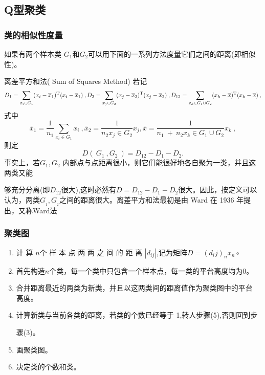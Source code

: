 \documentclass[12pt]{ctexart}
\numberwithin{equation}{section} %
\begin{document}
\subsection{Q型聚类}
\subsubsection{类的相似性度量}

如果有两个样本类 $G_1$和$G_2$可以用下面的一系列方法度量它们之间的距离(即相似性)。

离差平方和法( Sum of Squares Method)
 若记$$D_{1}=\sum_{x_{i}\in G_{1}}(x_{i}-\overline{x}_{1})^{\mathrm{T}}(x_{i}-\overline{x}_{1})\:,D_{2}=\sum_{x_{j}\in G_{2}}(x_{j}-\overline{x}_{2})^{\mathrm{T}}(x_{j}-\overline{x}_{2})\:,\\D_{12}=\sum_{x_{k}\in G_{1}\cup G_{2}}(x_{k}-\overline{x})^{\mathrm{T}}(x_{k}-\overline{x})\:,$$
式中
$$\overline{x}_{1}=\frac{1}{n_{1}}\sum_{x_{i}\in G_{1}}x_{i}\:,\overline{x}_{2}=\frac{1}{n_{2}x_{j}\in G_{2}}x_{j},\overline{x}=\frac{1}{n_{1}\:+\:n_{2}x_{k}\in G_{1}\cup G_{2}}x_{k}\:,$$
则定
$$D(\:G_{1}\:,G_{2}\:)=D_{12}-D_{1}-D_{2}.$$
事实上，若$G_1,G_2$ 内部点与点距离很小，则它们能很好地各自聚为一类，并且这两类又能

够充分分离(即$D_{12}$很大),这时必然有$D=D_{12}-D_{1}-D_{2}$很大。因此，按定义可以认为，两类$G_{_1},G_{_2}$之间的距离很大。离差平方和法最初是由 Ward 在 1936 年提出，又称Ward法
  
\subsubsection{聚类图}
\begin{enumerate}


  \item 计 算  $n$个 样 本 点 两 两 之 间 的 距 离 $\left | d_{ij}\right | $,记为矩阵$D=(d_ij)_nx_n\circ$
  \item 首先构造$n$个类，每一个类中只包含一个样本点，每一类的平台高度均为0。
  \item 合并距离最近的两类为新类，并且以这两类间的距离值作为聚类图中的平台
高度。
\item 计算新类与当前各类的距离，若类的个数已经等于 1,转人步骤(5),否则回到步

骤(3)。

\item 画聚类图。

\item  决定类的个数和类。
\end{enumerate}
\end{document}
